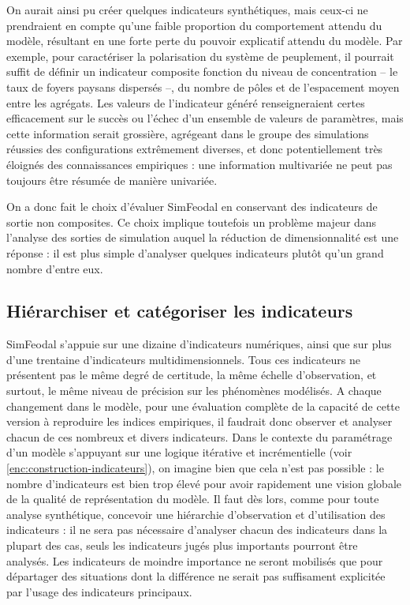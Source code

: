 On aurait ainsi pu créer quelques indicateurs synthétiques, mais ceux-ci ne prendraient en compte qu'une faible proportion du comportement attendu du modèle, résultant en une forte perte du pouvoir explicatif attendu du modèle.
Par exemple, pour caractériser la polarisation du système de peuplement, il pourrait suffit de définir un indicateur composite fonction du niveau de concentration -- le taux de foyers paysans dispersés --, du nombre de pôles et de l'espacement moyen entre les agrégats.
Les valeurs de l'indicateur généré renseigneraient certes efficacement sur le succès ou l'échec d'un ensemble de valeurs de paramètres, mais cette information serait grossière, agrégeant dans le groupe des \og simulations réussies\fg{} des configurations extrêmement diverses, et donc potentiellement très éloignés des connaissances empiriques :
une information multivariée ne peut pas toujours être résumée de manière univariée.

On a donc fait le choix d'évaluer SimFeodal en conservant des indicateurs de sortie non composites.
Ce choix implique toutefois un problème majeur dans l'analyse des sorties de simulation auquel la réduction de dimensionnalité est une réponse :
il est plus simple d'analyser quelques indicateurs plutôt qu'un grand nombre d'entre eux.
	

\subsection{Hiérarchiser et catégoriser les indicateurs}

SimFeodal s'appuie sur une dizaine d'indicateurs numériques, ainsi que sur plus d'une trentaine d'indicateurs multidimensionnels.
Tous ces indicateurs ne présentent pas le même degré de certitude, la même échelle d'observation, et surtout, le même niveau de précision sur les phénomènes modélisés.
A chaque changement dans le modèle, pour une évaluation complète de la capacité de cette version à reproduire les indices empiriques, il faudrait donc observer et analyser chacun de ces nombreux et divers indicateurs.
Dans le contexte du paramétrage d'un modèle s'appuyant sur une logique itérative et incrémentielle (voir \cref{enc:construction-indicateurs}), on imagine bien que cela n'est pas possible :
le nombre d'indicateurs est bien trop élevé pour avoir rapidement une vision globale de la qualité de représentation du modèle.
Il faut dès lors, comme pour toute analyse synthétique, concevoir une hiérarchie d'observation et d'utilisation des indicateurs :
il ne sera pas nécessaire d'analyser chacun des indicateurs dans la plupart des cas, seuls les indicateurs jugés plus importants pourront être analysés.
Les indicateurs de moindre importance ne seront mobilisés que pour départager des situations dont la différence ne serait pas suffisament explicitée par l'usage des indicateurs principaux.

